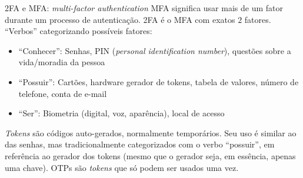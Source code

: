 \documentclass[utf8]{beamer}
\begin{document}
\begin{frame}{2FA e MFA: \emph{multi-factor authentication}}
  MFA significa usar mais de um fator
  durante um processo de autenticação.
  2FA é o MFA com exatos $2$ fatores.
  \vfill
  ``Verbos'' categorizando possíveis fatores:
  \begin{itemize}
    \item ``Conhecer'':
          Senhas, PIN (\emph{personal identification number}),
          questões sobre a vida/moradia da pessoa
    \item ``Possuir'':
          Cartões, hardware gerador de tokens, tabela de valores,
          número de telefone, conta de e-mail
    \item ``Ser'':
          Biometria (digital, voz, aparência), local de acesso
  \vfill
  \end{itemize}
  \vfill
  \emph{Tokens} são códigos auto-gerados, normalmente temporários.
  Seu uso é similar ao das senhas,
  mas tradicionalmente categorizados com o verbo ``possuir'',
  em referência ao gerador dos tokens
  (mesmo que o gerador seja, em essência, apenas uma chave).
  OTPs são \emph{tokens} que só podem ser usados uma vez.
\end{frame}
\end{document}
